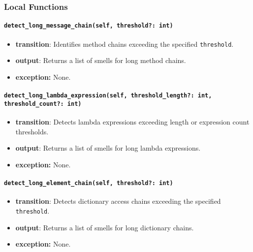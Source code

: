 \documentclass[12pt, titlepage]{article}
\begin{document}
\subsubsection{Local Functions}
\paragraph{\texttt{detect\_long\_message\_chain(self, threshold?: int)}}
\begin{itemize}
  \item \textbf{transition}: Identifies method chains exceeding the specified \texttt{threshold}.
  \item \textbf{output}: Returns a list of smells for long method chains.
  \item \textbf{exception:} None.
\end{itemize}

\paragraph{\texttt{detect\_long\_lambda\_expression(self, threshold\_length?: int, threshold\_count?: int)}}
\begin{itemize}
  \item \textbf{transition}: Detects lambda expressions exceeding length or expression count thresholds.
  \item \textbf{output}: Returns a list of smells for long lambda expressions.
  \item \textbf{exception:} None.
\end{itemize}

\paragraph{\texttt{detect\_long\_element\_chain(self, threshold?: int)}}
\begin{itemize}
  \item \textbf{transition}: Detects dictionary access chains exceeding the specified \texttt{threshold}.
  \item \textbf{output}: Returns a list of smells for long dictionary chains.
  \item \textbf{exception:} None.
\end{itemize}
\end{document}
